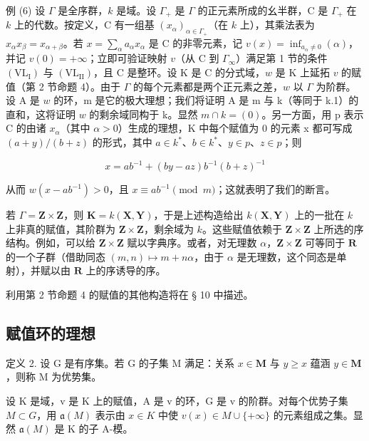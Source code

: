 例 (6) 设 \(\Gamma\) 是全序群，\(k\) 是域。设 \(\Gamma_{+}\) 是 \(\Gamma\) 的正元素所成的幺半群，C 是 \(\Gamma_{+}\) 在 \(k\) 上的代数。按定义，C 有一组基 \((x_{\alpha})_{\alpha \in \Gamma_{+}}\)（在 \(k\) 上），其乘法表为 \(x_{\alpha}x_{\beta} = x_{\alpha +\beta}\)。若 \(x = \sum_{\alpha}a_{\alpha}x_{\alpha}\) 是 C 的非零元素，记 \(v(x) = \inf_{a_{\alpha}\neq 0}(\alpha)\)，并记 \(v(0) = +\infty\)；立即可验证映射 \(v\)（从 C 到 \(\Gamma_{\infty}\)）满足第 1 节的条件 \((\mathrm{VL}_{\mathrm{I}})\) 与 \((\mathrm{VL}_{\mathrm{II}})\)，且 C 是整环。设 K 是 C 的分式域，\(w\) 是 K 上延拓 \(v\) 的赋值（第 2 节命题 4）。由于 \(\Gamma\) 的每个元素都是两个正元素之差，\(w\) 以 \(\Gamma\) 为阶群。设 A 是 \(w\) 的环，m 是它的极大理想；我们将证明 A 是 m 与 k（等同于 k.1）的直和，这将证明 \(w\) 的剩余域同构于 k。显然 \(m \cap k = (0)\)。另一方面，用 p 表示 C 的由诸 \(x_{\alpha}\)（其中 \(\alpha > 0\)）生成的理想，K 中每个赋值为 0 的元素 x 都可写成 \((a + y)/(b + z)\) 的形式，其中 \(a \in k^{*}\)、\(b \in k^{*}\)、\(y \in p\)、\(z \in p\)；则

\[
x = a b ^ {- 1} + (b y - a z) b ^ {- 1} (b + z) ^ {- 1}
\]

从而 \(w(x - ab^{-1}) > 0\)，且 \(x \equiv ab^{-1} \pmod{m}\)；这就表明了我们的断言。

若 \(\Gamma = \mathbf{Z} \times \mathbf{Z}\)，则 \(\mathbf{K} = k(\mathbf{X}, \mathbf{Y})\)，于是上述构造给出 \(k(\mathbf{X}, \mathbf{Y})\) 上的一批在 \(k\) 上非真的赋值，其阶群为 \(\mathbf{Z} \times \mathbf{Z}\)，剩余域为 \(k\)。这些赋值依赖于 \(\mathbf{Z} \times \mathbf{Z}\) 上所选的序结构。例如，可以给 \(\mathbf{Z} \times \mathbf{Z}\) 赋以字典序。或者，对无理数 \(\alpha\)，\(\mathbf{Z} \times \mathbf{Z}\) 可等同于 \(\mathbf{R}\) 的一个子群（借助同态 \((m, n) \mapsto m + n\alpha\)，由于 \(\alpha\) 是无理数，这个同态是单射），并赋以由 \(\mathbf{R}\) 上的序诱导的序。

利用第 2 节命题 4 的赋值的其他构造将在 § 10 中描述。

\subsection{赋值环的理想}

定义 2. 设 G 是有序集。若 G 的子集 M 满足：关系 \(x \in \mathbf{M}\) 与 \(y \geqslant x\) 蕴涵 \(y \in \mathbf{M}\)，则称 M 为优势集。

设 K 是域，v 是 K 上的赋值，A 是 v 的环，G 是 v 的阶群。对每个优势子集 \(M \subset G\)，用 \(\mathfrak{a}(M)\) 表示由 \(x \in K\) 中使 \(v(x) \in M \cup \{+\infty\}\) 的元素组成之集。显然 \(\mathfrak{a}(M)\) 是 K 的子 A-模。

